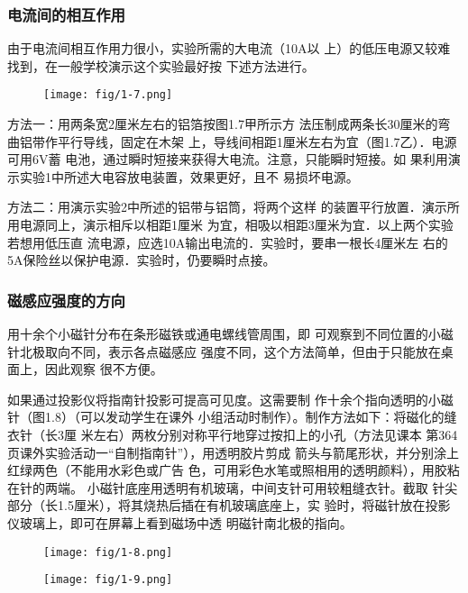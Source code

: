 \subsubsection{电流间的相互作用}
由于电流间相互作用力很小，实验所需的大电流（10A以
上）的低压电源又较难找到，在一般学校演示这个实验最好按
下述方法进行。
\begin{figure}[htp]
    \centering
\texttt{[image: fig/1-7.png]}
    \caption{}
\end{figure}

方法一：用两条宽2厘米左右的铝箔按图1.7甲所示方
法压制成两条长30厘米的弯曲铝带作平行导线，固定在木架
上，导线间相距1厘米左右为宜（图1.7乙）．电源可用6V蓄
电池，通过瞬时短接来获得大电流。注意，只能瞬时短接。如
果利用演示实验1中所述大电容放电装置，效果更好，且不
易损坏电源。

方法二：用演示实验2中所述的铝带与铝筒，将两个这样
的装置平行放置．演示所用电源同上，演示相斥以相距1厘米
为宜，相吸以相距3厘米为宜．以上两个实验若想用低压直
流电源，应选10A输出电流的．实验时，要串一根长4厘米左
右的5A保险丝以保护电源．实验时，仍要瞬时点接。

\subsubsection{磁感应强度的方向}
用十余个小磁针分布在条形磁铁或通电螺线管周围，即
可观察到不同位置的小磁针北极取向不同，表示各点磁感应
强度不同，这个方法简单，但由于只能放在桌面上，因此观察
很不方便。


如果通过投影仪将指南针投影可提高可见度。这需要制
作十余个指向透明的小磁针（图1.8）（可以发动学生在课外
小组活动时制作）。制作方法如下：将磁化的缝衣针（长3厘
米左右）两枚分别对称平行地穿过按扣上的小孔（方法见课本
第364页课外实验活动一“自制指南针”），用透明胶片剪成
箭头与箭尾形状，并分别涂上红绿两色（不能用水彩色或广告
色，可用彩色水笔或照相用的透明颜料），用胶粘在针的两端。
小磁针底座用透明有机玻璃，中间支针可用较粗缝衣针。截取
针尖部分（长1.5厘米），将其烧热后插在有机玻璃底座上，实
验时，将磁针放在投影仪玻璃上，即可在屏幕上看到磁场中透
明磁针南北极的指向。

\begin{figure}[htp]\centering
    \begin{minipage}[t]{0.48\textwidth}
    \centering
\texttt{[image: fig/1-8.png]}
    \caption{}
    \end{minipage}
    \begin{minipage}[t]{0.48\textwidth}
    \centering
\texttt{[image: fig/1-9.png]}
    \caption{}
    \end{minipage}
    \end{figure}


